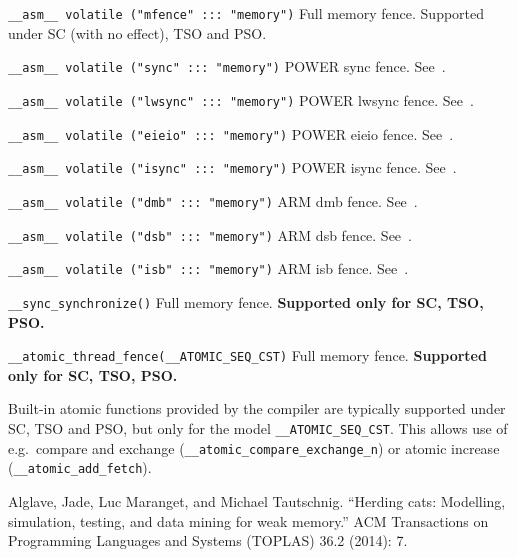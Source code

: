 \documentclass[a4paper]{article}
\newcommand{\limitsupport}[1]{\textbf{Supported only for #1.}}
\begin{document}
\begin{description}
\item{\texttt{\_\_asm\_\_ volatile ("mfence" :::\ "memory")}} Full
  memory fence. Supported under SC (with no effect), TSO and PSO.
\item{\texttt{\_\_asm\_\_ volatile ("sync" :::\ "memory")}} POWER \textsf{sync} fence. See~\cite{alglaveHerding}.
\item{\texttt{\_\_asm\_\_ volatile ("lwsync" :::\ "memory")}} POWER \textsf{lwsync} fence. See~\cite{alglaveHerding}.
\item{\texttt{\_\_asm\_\_ volatile ("eieio" :::\ "memory")}} POWER \textsf{eieio} fence. See~\cite{alglaveHerding}.
\item{\texttt{\_\_asm\_\_ volatile ("isync" :::\ "memory")}} POWER \textsf{isync} fence. See~\cite{alglaveHerding}.
\item{\texttt{\_\_asm\_\_ volatile ("dmb" :::\ "memory")}} ARM \textsf{dmb} fence. See~\cite{alglaveHerding}.
\item{\texttt{\_\_asm\_\_ volatile ("dsb" :::\ "memory")}} ARM \textsf{dsb} fence. See~\cite{alglaveHerding}.
\item{\texttt{\_\_asm\_\_ volatile ("isb" :::\ "memory")}} ARM \textsf{isb} fence. See~\cite{alglaveHerding}.
\item{\texttt{\_\_sync\_synchronize()}} Full memory fence. \limitsupport{SC, TSO, PSO}
\item{\texttt{\_\_atomic\_thread\_fence(\_\_ATOMIC\_SEQ\_CST)}} Full memory fence. \limitsupport{SC, TSO, PSO}
\end{description}

Built-in atomic functions provided by the compiler are typically
supported under SC, TSO and PSO, but only for the model
\texttt{\_\_ATOMIC\_SEQ\_CST}. This allows use of e.g.\ compare and
exchange (\texttt{\_\_atomic\_compare\_exchange\_n}) or atomic
increase (\texttt{\_\_atomic\_add\_fetch}).

\begin{thebibliography}{99}
  Alglave, Jade, Luc Maranget, and Michael Tautschnig. ``Herding cats: Modelling, simulation, testing, and data mining for weak memory.'' ACM Transactions on Programming Languages and Systems (TOPLAS) 36.2 (2014): 7.
\end{thebibliography}
\end{document}
